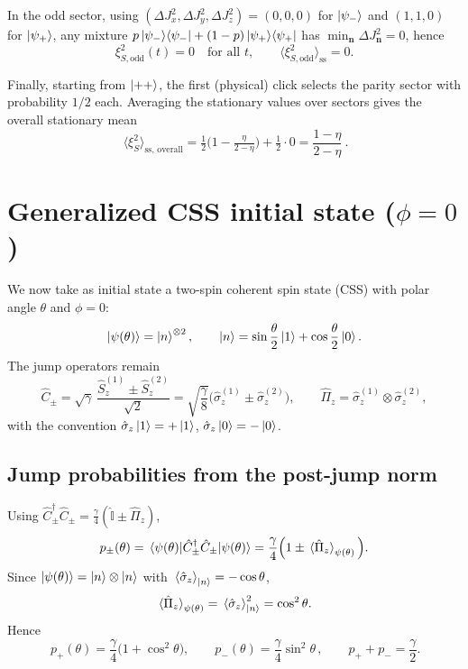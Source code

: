 \documentclass[12pt,a4paper]{article}
\begin{document}
	In the odd sector, using \((\Delta J_x^2,\Delta J_y^2,\Delta J_z^2)=(0,0,0)\) for \(\ket{\psi_-}\) and \((1,1,0)\) for \(\ket{\psi_+}\),
	any mixture \(p\ket{\psi_-}\!\bra{\psi_-}+(1-p)\ket{\psi_+}\!\bra{\psi_+}\) has \(\min_{\mathbf n}\Delta J_{\mathbf n}^2=0\), hence
	\[
	\xi_{S,\mathrm{odd}}^2(t)=0\quad\text{for all }t,\qquad
	\big\langle \xi_{S,\mathrm{odd}}^2\big\rangle_{\mathrm{ss}}=0.
	\]
	
	Finally, starting from \(\ket{++}\), the first (physical) click selects the parity sector with probability \(1/2\) each.
	Averaging the stationary values over sectors gives the overall stationary mean
	\[
	\boxed{\ \big\langle \xi_S^2\big\rangle_{\mathrm{ss,\,overall}}
		=\tfrac{1}{2}\Big(1-\tfrac{\eta}{2-\eta}\Big)+\tfrac{1}{2}\cdot 0
		=\frac{1-\eta}{2-\eta}\ }.
	\]
	
	
\section{Generalized CSS initial state (\texorpdfstring{$\phi=0$}{phi=0})}

We now take as initial state a two-spin coherent spin state (CSS) with polar angle \(\theta\) and \(\phi=0\):
\[
\ket{\psi(\theta)}=\ket{n}^{\otimes 2},\qquad 
\ket{n}=\sin\frac{\theta}{2}\ket{1}+\cos\frac{\theta}{2}\ket{0}.
\]
The jump operators remain
\[
\hat C_{\pm}=\sqrt{\gamma}\,\frac{\hat S_z^{(1)}\pm \hat S_z^{(2)}}{\sqrt{2}}
=\sqrt{\frac{\gamma}{8}}\big(\hat\sigma_z^{(1)}\pm \hat\sigma_z^{(2)}\big),
\qquad
\hat\Pi_z=\hat\sigma_z^{(1)}\otimes \hat\sigma_z^{(2)},
\]
with the convention \(\hat\sigma_z\ket{1}=+\ket{1}\), \(\hat\sigma_z\ket{0}=-\ket{0}\).

\subsection*{Jump probabilities from the post-jump norm}

Using \(\hat C_\pm^\dagger\hat C_\pm=\tfrac{\gamma}{4}(\hat{\mathbb I}\pm \hat\Pi_z)\),
\[
p_\pm(\theta)=\mel{\psi(\theta)}{\hat C_\pm^\dagger\hat C_\pm}{\psi(\theta)}
=\frac{\gamma}{4}\Big(1\pm \expval*{\hat\Pi_z}_{\psi(\theta)}\Big).
\]
Since \(\ket{\psi(\theta)}=\ket{n}\otimes\ket{n}\) with \(\expval*{\hat\sigma_z}_{\ket{n}}=-\cos\theta\),
\[
\expval*{\hat\Pi_z}_{\psi(\theta)}
=\expval*{\hat\sigma_z}_{\ket{n}}^2=\cos^2\theta.
\]
Hence
\[
\boxed{\,p_+(\theta)=\frac{\gamma}{4}\big(1+\cos^2\theta\big),\qquad
	p_-(\theta)=\frac{\gamma}{4}\sin^2\theta\,},\qquad
p_++p_-=\frac{\gamma}{2}.
\]
\end{document}
